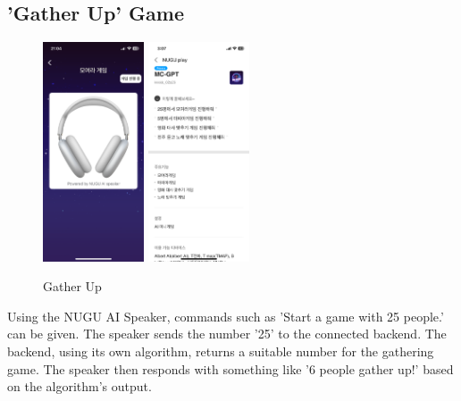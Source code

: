 \documentclass[conference]{IEEEtran}
\begin{document}
    \subsection{'Gather Up' Game}
        \begin{figure}[htbp]
            \centerline{\includegraphics[width=3cm]{Images/screen/game/gather/GATHERUP.PNG}
            \includegraphics[width=3cm]{Images/screen/game/gather/NUGU_Playbuilder.png}}
            \caption{Gather Up}
            \label{fig}
        \end{figure}
        Using the NUGU AI Speaker, commands such as 'Start a game with 25 people.' can be given. The speaker sends the number '25' to the connected backend. The backend, using its own algorithm, returns a suitable number for the gathering game. The speaker then responds with something like '6 people gather up!' based on the algorithm's output.
        
\end{document}
